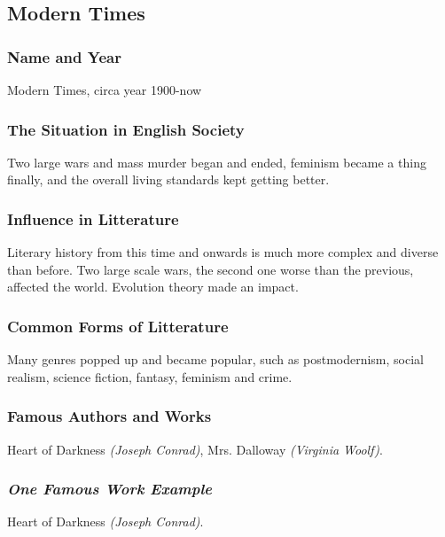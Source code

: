 \newpage
\subsection{Modern Times}

\subsubsection{Name and Year}
Modern Times, circa year 1900-now

\subsubsection{The Situation in English Society}
Two large wars and mass murder began and ended, feminism became a thing finally, and the overall living standards kept getting better.

\subsubsection{Influence in Litterature}
Literary history from this time and onwards is much more complex and diverse than before. Two large scale wars, the second one worse than the previous, affected the world. Evolution theory made an impact.

\subsubsection{Common Forms of Litterature}
Many genres popped up and became popular, such as postmodernism, social realism, science fiction, fantasy, feminism and crime.

\subsubsection{Famous Authors and Works}
Heart of Darkness \textit{(Joseph Conrad)}, Mrs. Dalloway \textit{(Virginia Woolf)}.

\subsubsection{\textit{One Famous Work Example}}
Heart of Darkness \textit{(Joseph Conrad)}.











